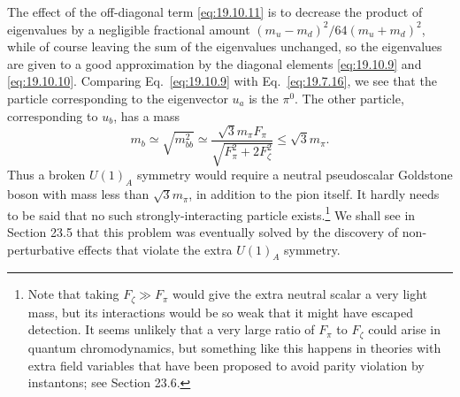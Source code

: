The effect of the off-diagonal term \eqref{eq:19.10.11} is to decrease the product of eigenvalues by a negligible fractional amount $(m_u-m_d)^2/64(m_u+m_d)^2$, while of course leaving the sum of the eigenvalues unchanged, so the eigenvalues are given to a good approximation by the diagonal elements \eqref{eq:19.10.9} and \eqref{eq:19.10.10}. Comparing Eq.~\eqref{eq:19.10.9} with Eq.~\eqref{eq:19.7.16}, we see that the particle corresponding to the eigenvector $u_a$ is the $\pi^0$. The other particle, corresponding to $u_b$, has a mass
\begin{equation}
m_b\simeq\sqrt{m_{bb}^2}
\simeq
\frac{\sqrt3m_\pi F_\pi}
{\sqrt{F_\pi^2+2F_\zeta^2}}
\leq\sqrt3m_\pi.
\tag{19.10.12}\label{eq:19.10.12}
\end{equation}
Thus a broken $U(1)_A$ symmetry would require a neutral pseudoscalar Goldstone boson with mass less than $\sqrt3m_\pi$, in addition to the pion itself. It hardly needs to be said that no such strongly-interacting particle exists.\footnote{Note that taking $F_\zeta\gg F_\pi$ would give the extra neutral scalar a very light mass, but its interactions would be so weak that it might have escaped detection. It seems unlikely that a very large ratio of $F_\pi$ to $F_\zeta$ could arise in quantum chromodynamics, but something like this happens in theories with extra field variables that have been proposed to avoid parity violation by instantons; see Section 23.6.} We shall see in Section 23.5 that this problem was eventually solved by the discovery of non-perturbative effects that violate the extra $U(1)_A$ symmetry.
